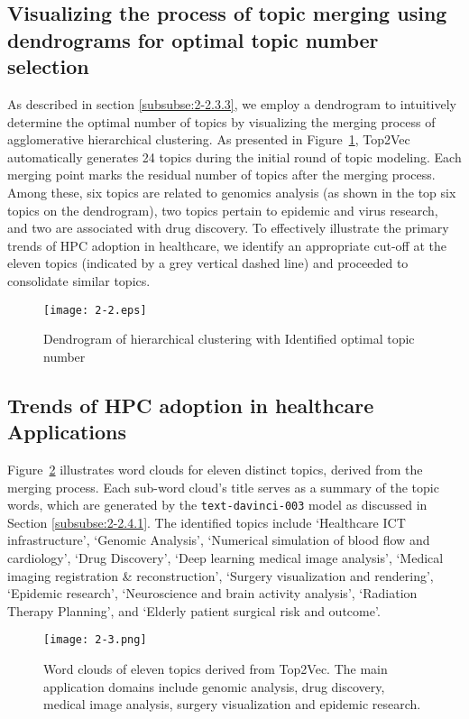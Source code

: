 \subsection{Visualizing the process of topic merging using dendrograms for optimal topic number selection}\label{subse:2-3.2}

As described in section \ref{subsubse:2-2.3.3}, we employ a dendrogram to intuitively determine the optimal number of topics by visualizing the merging process of agglomerative hierarchical clustering. As presented in Figure~\ref{fig:2-2}, Top2Vec automatically generates 24 topics during the initial round of topic modeling. Each merging point marks the residual number of topics after the merging process. Among these, six topics are related to genomics analysis (as shown in the top six topics on the dendrogram), two topics pertain to epidemic and virus research, and two are associated with drug discovery. To effectively illustrate the primary trends of HPC adoption in healthcare, we identify an appropriate cut-off at the eleven topics (indicated by a grey vertical dashed line) and proceeded to consolidate similar topics.

\begin{figure}[!h]
\centering
\texttt{[image: 2-2.eps]}
\caption{Dendrogram of hierarchical clustering with Identified optimal topic number}
\label{fig:2-2}
\end{figure}

\subsection{Trends of HPC adoption in healthcare Applications}\label{subse:2-3.3}


Figure~\ref{fig:2-3} illustrates word clouds for eleven distinct topics, derived from the merging process. Each sub-word cloud's title serves as a summary of the topic words, which are generated by the \texttt{text-davinci-003} model as discussed in Section \ref{subsubse:2-2.4.1}. The identified topics include `Healthcare ICT infrastructure', `Genomic Analysis', `Numerical simulation of blood flow and cardiology', `Drug Discovery', `Deep learning medical image analysis', `Medical imaging registration \& reconstruction', `Surgery visualization and rendering', `Epidemic research', `Neuroscience and brain activity analysis', `Radiation Therapy Planning', and `Elderly patient surgical risk and outcome'.

\begin{figure}[!h]
\centering
\texttt{[image: 2-3.png]}
\caption{Word clouds of eleven topics derived from Top2Vec. The main application domains include genomic analysis, drug discovery, medical image analysis, surgery visualization and epidemic research.}
\label{fig:2-3}
\end{figure}

